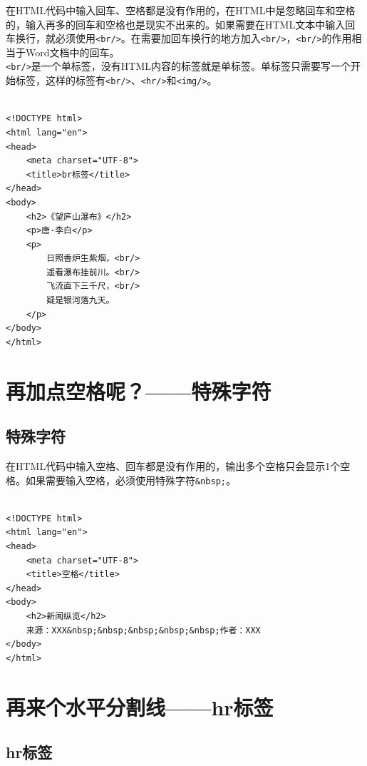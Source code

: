 在HTML代码中输入回车、空格都是没有作用的，在HTML中是忽略回车和空格的，输入再多的回车和空格也是现实不出来的。如果需要在HTML文本中输入回车换行，就必须使用\lstinline|<br/>|。在需要加回车换行的地方加入\lstinline|<br/>|，\lstinline|<br/>|的作用相当于Word文档中的回车。 \\

\lstinline|<br/>|是一个单标签，没有HTML内容的标签就是单标签。单标签只需要写一个开始标签，这样的标签有\lstinline|<br/>|、\lstinline|<hr/>|和\lstinline|<img/>|。 \\

 \\
\begin{lstlisting}[style=htmlcssjs]
<!DOCTYPE html>
<html lang="en">
<head>
    <meta charset="UTF-8">
    <title>br标签</title>
</head>
<body>
    <h2>《望庐山瀑布》</h2>
    <p>唐·李白</p>
    <p>
        日照香炉生紫烟，<br/>
        遥看瀑布挂前川。<br/>
        飞流直下三千尺，<br/>
        疑是银河落九天。
    </p>
</body>
</html>
\end{lstlisting}

\newpage

\section{再加点空格呢？——特殊字符}

\subsection{特殊字符}

在HTML代码中输入空格、回车都是没有作用的，输出多个空格只会显示1个空格。如果需要输入空格，必须使用特殊字符\lstinline|&nbsp;|。 \\

 \\
\begin{lstlisting}[style=htmlcssjs]
<!DOCTYPE html>
<html lang="en">
<head>
    <meta charset="UTF-8">
    <title>空格</title>
</head>
<body>
    <h2>新闻纵览</h2>
    来源：XXX&nbsp;&nbsp;&nbsp;&nbsp;&nbsp;作者：XXX
</body>
</html>
\end{lstlisting}

\newpage

\section{再来个水平分割线——hr标签}

\subsection{hr标签}

